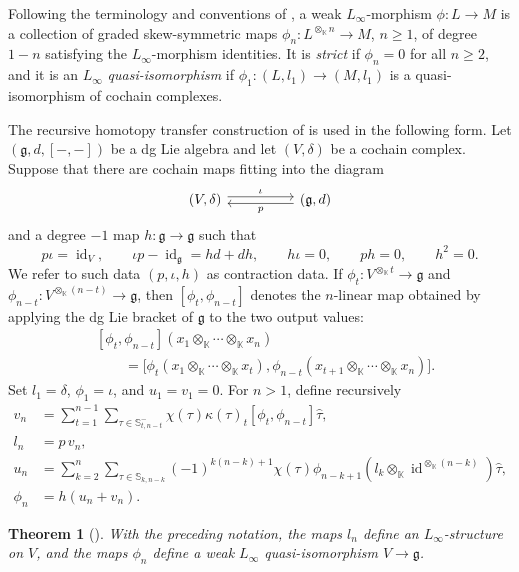 \documentclass[11pt,a4paper,reqno]{amsart}
\newcommand{\mK}{\mathbb K}
\newcommand{\mS}{\mathbb S}
\newcommand{\id}{\operatorname{id}}
\theoremstyle{plain}
\newtheorem{theorem}{Theorem}[section]
\theoremstyle{definition}
\numberwithin{equation}{section}
\begin{document}
	Following the terminology and conventions of \cite[Definition~2.4]{RR22}, a weak $L_\infty$-morphism
	$\phi:L\to M$ is a collection of graded skew-symmetric maps
	$\phi_n:L^{\otimes_{\mK}n}\to M$, $n\geq1$, of degree $1-n$ satisfying the
	$L_\infty$-morphism identities. It is \emph{strict} if $\phi_n=0$ for all
	$n\geq2$, and it is an $L_\infty$ \emph{quasi-isomorphism} if
	$\phi_1:(L,l_1)\to(M,l_1)$ is a quasi-isomorphism of cochain complexes.
	
	The recursive homotopy transfer construction of
	\cite[Section~2]{RR22} is used in the following form. Let $(\mathfrak g,d,[-,-])$ be a dg Lie algebra and
	let $(V,\delta)$ be a cochain complex. Suppose that there are cochain maps
	fitting into the diagram
	\[\begin{tikzcd}
		(V,\delta) && (\mathfrak g,d)
		\arrow["\iota", shift left, from=1-1, to=1-3]
		\arrow["p", shift left, from=1-3, to=1-1]
	\end{tikzcd}\]
	and a degree $-1$ map $h:\mathfrak g\to\mathfrak g$ such that
	\[
	p\iota=\id_V,
	\qquad
	\iota p-\id_{\mathfrak g}=hd+dh,
	\qquad
	h\iota=0,
	\qquad
	ph=0,
	\qquad
	h^2=0.
	\]
	We refer to such data $(p,\iota,h)$ as contraction data.
	If $\phi_t:V^{\otimes_{\mK}t}\to\mathfrak g$ and
	$\phi_{n-t}:V^{\otimes_{\mK}(n-t)}\to\mathfrak g$, then
	$[\phi_t,\phi_{n-t}]$ denotes the $n$-linear map obtained by applying the dg
	Lie bracket of $\mathfrak g$ to the two output values:
	\[
	\begin{aligned}
		&[\phi_t,\phi_{n-t}]
		(x_1\otimes_{\mK}\cdots\otimes_{\mK}x_n)
		\\
		&\qquad=
		\bigl[
		\phi_t(x_1\otimes_{\mK}\cdots\otimes_{\mK}x_t),
		\phi_{n-t}(x_{t+1}\otimes_{\mK}\cdots\otimes_{\mK}x_n)
		\bigr].
	\end{aligned}
	\]
	Set $l_1=\delta$, $\phi_1=\iota$, and $u_1=v_1=0$. For $n>1$, define
	recursively
	\begin{align}
		v_n
		&=
		\sum_{t=1}^{n-1}
		\sum_{\tau\in\mS_{t,n-t}^{-}}
		\chi(\tau)\kappa(\tau)_t
		[\phi_t,\phi_{n-t}]\widehat\tau,
		\label{eq:vn}\\
		l_n&=p\,v_n,
		\label{eq:ln}\\
		u_n
		&=
		\sum_{k=2}^{n}
		\sum_{\tau\in\mS_{k,n-k}}
		(-1)^{k(n-k)+1}\chi(\tau)
		\phi_{n-k+1}(l_k\otimes_{\mK}\id^{\otimes_{\mK}(n-k)})\widehat\tau,
		\label{eq:un}\\
		\phi_n&=h(u_n+v_n).
		\label{eq:phin}
	\end{align}
	
	\begin{theorem}[{\cite[Theorem~2.7]{RR22}}]\label{thm:transfer-theorem}
		With the preceding notation, the maps $l_n$ define an $L_\infty$-structure
		on $V$, and the maps $\phi_n$ define a weak $L_\infty$ quasi-isomorphism
		$V\to\mathfrak g$.
	\end{theorem}
	
\end{document}
